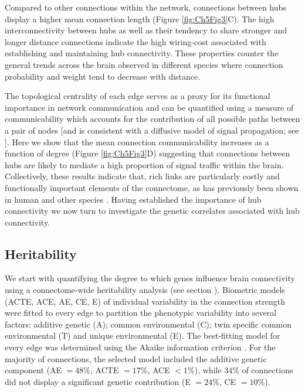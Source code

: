 Compared to other connections within the network, connections between hubs display a higher mean connection length (Figure \ref{fig:Ch5Fig3}C). The high interconnectivity between hubs as well as their tendency to share stronger and longer distance connections indicate the high wiring-cost associated with establishing and maintaining hub connectivity. These properties counter the general trends across the brain observed in different species where connection probability \citep{Arnatkeviciute2018,Fornito2019,Fulcher2016} and weight \citep{Betzel2018} tend to decrease with distance.

The topological centrality of each edge serves as a proxy for its functional importance in network communication and can be quantified using a measure of communicability which accounts for the contribution of all possible paths between a pair of nodes [and is consistent with a diffusive model of signal propagation; see \citep{Avena-Koenigsberger2017}]. Here we show that the mean connection communicability increases as a function of degree (Figure \ref{fig:Ch5Fig3}D) suggesting that connections between hubs are likely to mediate a high proportion of signal traffic within the brain. Collectively, these results indicate that, rich links are particularly costly and functionally important elements of the connectome, as has previously been shown in human \citep{VandenHeuvel2011} and other species \citep{Arnatkeviciute2018,Fulcher2016,Towlson2013}. Having established the importance of hub connectivity we now turn to investigate the genetic correlates associated with hub connectivity.

\subsection{Heritability}

We start with quantifying the degree to which genes influence brain connectivity using a connectome-wide heritability analysis (see section ). Biometric models (ACTE, ACE, AE, CE, E) of individual variability in the connection strength were fitted to every edge to partition the phenotypic variability into several factors: additive genetic (A); common environmental (C); twin specific common environmental (T) and unique environmental (E). The best-fitting model for every edge was determined using the Akaike information criterion \citep{Akaike1998}. For the majority of connections, the selected model included the additive genetic component (AE $= 48\%$, ACTE $= 17\%$, ACE $<1\%$), while $34\%$ of connections did not display a significant genetic contribution (E $= 24\%$, CE $= 10\%$).

